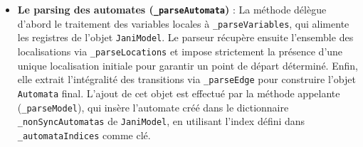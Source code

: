 \documentclass[14pt, a4paper]{extarticle}
\begin{document}
\begin{itemize}
    \item \textbf{Le parsing des automates (\texttt{\_parseAutomata})} : La méthode délègue d'abord le traitement des variables locales à \texttt{\_parseVariables}, qui alimente les registres de l'objet \texttt{JaniModel}. Le parseur récupère ensuite l'ensemble des localisations via \texttt{\_parseLocations} et impose strictement la présence d'une unique localisation initiale pour garantir un point de départ déterminé. Enfin, elle extrait l'intégralité des transitions via \texttt{\_parseEdge} pour construire l'objet \texttt{Automata} final. L'ajout de cet objet est effectué par la méthode appelante (\texttt{\_parseModel}), qui insère l'automate créé dans le dictionnaire \texttt{\_nonSyncAutomatas} de \texttt{JaniModel}, en utilisant l'index défini dans \texttt{\_automataIndices} comme clé.
    

\end{itemize}
\end{document}
